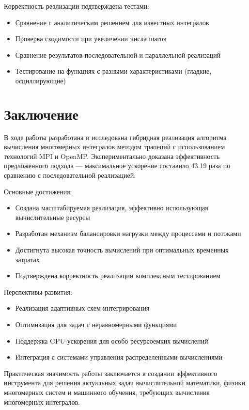 \documentclass[a4paper,12pt]{article}
\begin{document}
Корректность реализации подтверждена тестами:
\begin{itemize}
    \item Сравнение с аналитическим решением для известных интегралов
    \item Проверка сходимости при увеличении числа шагов
    \item Сравнение результатов последовательной и параллельной реализаций
    \item Тестирование на функциях с разными характеристиками (гладкие, осциллирующие)
\end{itemize}

\section*{Заключение}
В ходе работы разработана и исследована гибридная реализация алгоритма вычисления многомерных интегралов методом трапеций с использованием технологий MPI и OpenMP. 
Экспериментально доказана эффективность предложенного подхода — максимальное ускорение составило 43.19 раза по сравнению с последовательной реализацией.

Основные достижения:
\begin{itemize}
    \item Создана масштабируемая реализация, эффективно использующая вычислительные ресурсы
    \item Разработан механизм балансировки нагрузки между процессами и потоками
    \item Достигнута высокая точность вычислений при оптимальных временных затратах
    \item Подтверждена корректность реализации комплексным тестированием
\end{itemize}

Перспективы развития:
\begin{itemize}
    \item Реализация адаптивных схем интегрирования
    \item Оптимизация для задач с неравномерными функциями
    \item Поддержка GPU-ускорения для особо ресурсоемких вычислений
    \item Интеграция с системами управления распределенными вычислениями
\end{itemize}

Практическая значимость работы заключается в создании эффективного инструмента для решения актуальных задач вычислительной математики, 
физики многомерных систем и машинного обучения, требующих вычисления многомерных интегралов.
\end{document}
